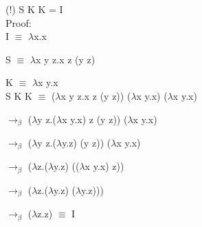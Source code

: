 \documentclass[12pt]{article}
\begin{document}
    (!) S K K = I\\
    
    Proof:\\
    
    I $\equiv$ $\lambda$x.x
    
    S $\equiv$ $\lambda$x y z.x z (y z)
    
    K $\equiv$ $\lambda$x y.x\\

    S K K $\equiv$ ($\lambda$x y z.x z (y z)) ($\lambda$x y.x) ($\lambda$x y.x)
    
    $\rightarrow_{\beta}$ ($\lambda$y z.($\lambda$x y.x) z (y z)) ($\lambda$x y.x)
    
    $\rightarrow_{\beta}$ ($\lambda$y z.($\lambda$y.z) (y z)) ($\lambda$x y.x)
    
    $\rightarrow_{\beta}$ ($\lambda$z.($\lambda$y.z) (($\lambda$x y.x) z))
    
    $\rightarrow_{\beta}$ ($\lambda$z.($\lambda$y.z) ($\lambda$y.z)))
    
    $\rightarrow_{\beta}$ ($\lambda$z.z) $\equiv$ I
    
\end{document}
